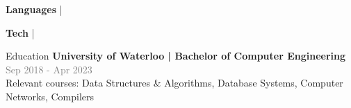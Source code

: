 \documentclass[hidelinks]{resume} %
\begin{document}
\vspace{-.05cm}
\begin{rSubsection}{\textbf{Languages} | }{}{}

\end{rSubsection}
\vspace{-.20cm}
\begin{rSubsection}{\textbf{Tech} | }{}{}

\end{rSubsection}

\vspace{-.20cm}

\begin{rSection}{Education}
\vspace{-.1cm}
{\textbf{University of Waterloo | Bachelor of Computer Engineering}} \hfill {\textcolor{gray}{\small Sep 2018 - Apr 2023}} 
\\ {Relevant courses: Data Structures \& Algorithms, Database Systems, Computer Networks, Compilers}
\vspace{.1cm}
\end{rSection}
\end{document}
